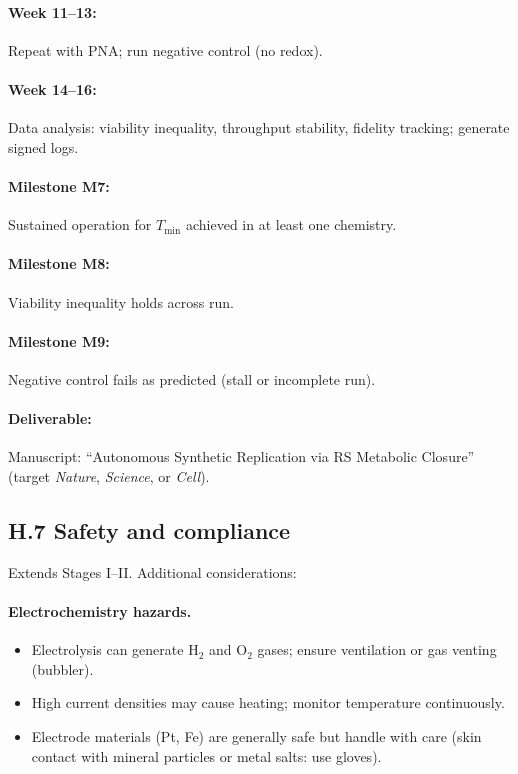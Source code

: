 \documentclass[11pt]{article}
\begin{document}
\paragraph{Week 11–13:} Repeat with PNA; run negative control (no redox).

\paragraph{Week 14–16:} Data analysis: viability inequality, throughput stability, fidelity tracking; generate signed logs.

\paragraph{Milestone M7:} Sustained operation for $T_{\min}$ achieved in at least one chemistry.

\paragraph{Milestone M8:} Viability inequality holds across run.

\paragraph{Milestone M9:} Negative control fails as predicted (stall or incomplete run).

\paragraph{Deliverable:} Manuscript: ``Autonomous Synthetic Replication via RS Metabolic Closure'' (target \emph{Nature}, \emph{Science}, or \emph{Cell}).

\subsection*{H.7 Safety and compliance}

Extends Stages I–II. Additional considerations:

\paragraph{Electrochemistry hazards.}
\begin{itemize}
\item Electrolysis can generate H$_2$ and O$_2$ gases; ensure ventilation or gas venting (bubbler).
\item High current densities may cause heating; monitor temperature continuously.
\item Electrode materials (Pt, Fe) are generally safe but handle with care (skin contact with mineral particles or metal salts: use gloves).
\end{itemize}
\end{document}
